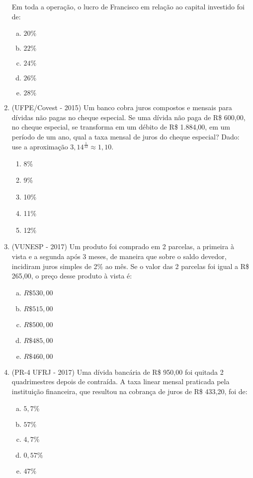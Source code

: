 \begin{enumerate}
  Em toda a operação, o lucro de Francisco em relação ao capital investido foi de:
  \begin{enumerate}[a)]
  \item $20\%$
  \item $22\%$
  \item $24\%$
  \item $26\%$
  \item $28\%$
  \end{enumerate}

  \item (UFPE/Covest - 2015) Um banco cobra juros compostos e mensais para dívidas não pagas no cheque especial. Se uma dívida não paga de R\$ 600,00, no cheque especial, se transforma em um débito de R\$ 1.884,00, em um período de um ano, qual a taxa mensal de juros do cheque especial? Dado: use a aproximação $3,14^{\frac{1}{12}} \approx 1,10$.
  \begin{enumerate}
  \item 8\%
  \item 9\%
  \item 10\%
  \item 11\%
  \item 12\%
  \end{enumerate}

  \item (VUNESP - 2017) Um produto foi comprado em 2 parcelas, a primeira à vista e a segunda após 3 meses, de maneira que sobre o saldo devedor, incidiram juros simples de 2\% ao mês. Se o valor das 2 parcelas foi igual a R\$ 265,00, o preço desse produto à vista é:
  \begin{enumerate}[a)]
  \item $R\$ 530,00$
  \item $R\$ 515,00$
  \item $R\$ 500,00$
  \item $R\$ 485,00$
  \item $R\$ 460,00$
  \end{enumerate}

  \item (PR-4 UFRJ - 2017) Uma dívida bancária de R\$ 950,00 foi quitada 2 quadrimestres depois de contraída. A taxa linear mensal praticada pela instituição financeira, que resultou na cobrança de juros de R\$ 433,20, foi de:
   \begin{enumerate}[a)]
  \item $5,7\%$
  \item $57\%$
  \item $4,7\%$
  \item $0,57\%$
  \item $47\%$
  \end{enumerate}


\end{enumerate}
